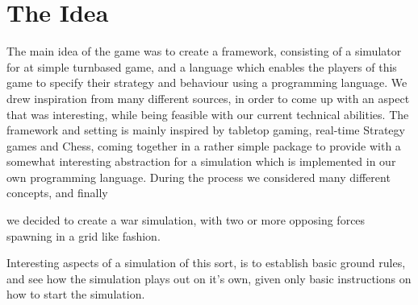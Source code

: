 \section{The Idea}
	The main idea of the game was to create a framework, consisting of a simulator for at simple turnbased game, and a language which enables the players of this game to specify their strategy and behaviour using a programming language.
	We drew inspiration from many different sources, in order to come up with an aspect that was interesting, while being feasible with our current technical abilities.
	The framework and setting is mainly inspired by tabletop gaming, real-time Strategy games and Chess, coming together in a rather simple package to provide with a somewhat interesting abstraction for a simulation which is implemented in our own programming language.
	During the process we considered many different concepts, 
	and finally
	\begin{comment}we came to a decision that it would be more interesting to 
	have a controlled environment with a lot of units participating. The simulation would not be very interesting to perform when dealing with minor numbers, 
	the reasoning behind this is that we do not expect to make a very complicated simulation, therefore dealing in larger numbers proved 
	more interesting to us. \newline
	
	Ultimately\end{comment}
	we decided to create a war simulation, with two or more opposing forces 
	spawning in a grid like fashion. 
	
	Interesting aspects of a simulation of this sort, is to establish basic ground rules, 
	and see how the simulation plays out on it's own, given only basic instructions on how to start the simulation.